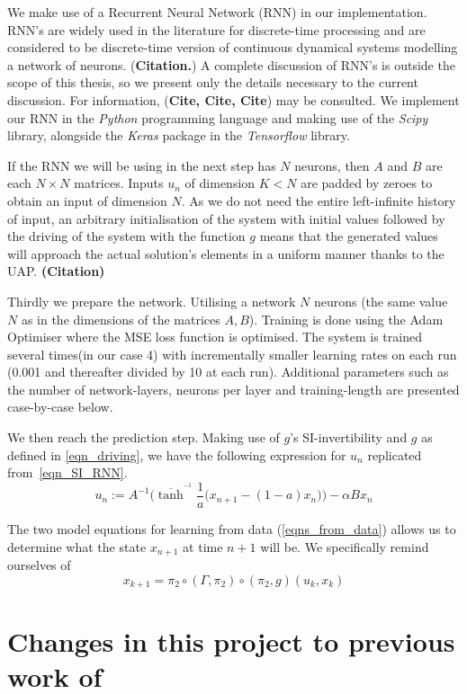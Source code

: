 \documentclass[a4paper,12pt,twoside]{report}
\begin{document}
We make use of a Recurrent Neural Network (RNN) in our implementation. RNN's are widely used in the literature for discrete-time processing and are considered to be discrete-time version of continuous dynamical systems modelling a network of neurons. (\textbf{Citation.})
A complete discussion of RNN's is outside the scope of this thesis, so we present only the details necessary to the current discussion. For information, (\textbf{Cite, Cite, Cite}) may be consulted. We implement our RNN in the \emph{Python} programming language and making use of the \emph{Scipy} library, alongside the \emph{Keras} package in the \emph{Tensorflow} library.

If the RNN we will be using in the next step has $N$ neurons, then $A$ and $B$ are each $N\times{N}$ matrices. Inputs $u_n$ of dimension $K < N$ are padded by zeroes to obtain an input of dimension $N$. As we do not need the entire left-infinite history of input, an arbitrary initialisation of the system with initial values followed by the driving of the system with the function $g$ means that the generated values will approach the actual solution’s elements in a uniform manner thanks to the UAP. \textbf{(Citation)}

Thirdly we prepare the network. Utilising a network $N$ neurons (the same value $N$ as in the dimensions of the matrices $A,B$). Training is done using the Adam Optimiser where the MSE loss function is optimised. The system is trained several times(in our case 4) with incrementally smaller learning rates on each run (0.001 and thereafter divided by 10 at each run). 
Additional parameters such as the number of network-layers, neurons per layer and training-length are presented case-by-case below.

We then reach the prediction step. Making use of $g$'s SI-invertibility and $g$ as defined in \eqref{eqn_driving}, we have the following expression for $u_n$ replicated from~\eqref{eqn_SI_RNN}.
\begin{equation*}
  u_n := A^{-1}\bigg(\overline{\tanh}^{^{-1}}\frac{1}{a}\Big(x_{n+1}-(1-a)x_n\Big) \bigg) - \alpha B x_n
\end{equation*}
    
The two model equations for learning from data (\eqref{eqns_from_data}) allows us to determine what the state $x_{n+1}$ at time $n+1$ will be. 
We specifically remind ourselves of \[x_{k+1}=\pi_2 \circ (\Gamma, \pi_2) \circ (\pi_2,g) (u_k,x_k)\]

\section{Changes in this project to previous work of~\cite{manjunath2021universal}}
\end{document}

